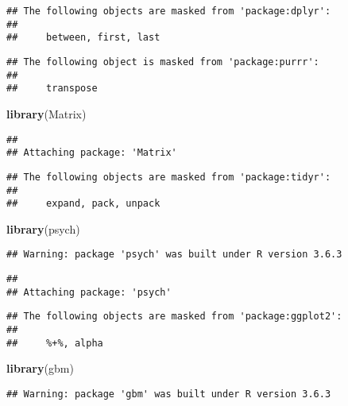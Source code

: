 \documentclass[]{article}
\newenvironment{Shaded}{\begin{snugshade}}{\end{snugshade}}
\newcommand{\KeywordTok}[1]{\textcolor[rgb]{0.13,0.29,0.53}{\textbf{#1}}}
\newcommand{\NormalTok}[1]{#1}
\begin{document}
\begin{verbatim}
## The following objects are masked from 'package:dplyr':
## 
##     between, first, last
\end{verbatim}

\begin{verbatim}
## The following object is masked from 'package:purrr':
## 
##     transpose
\end{verbatim}

\begin{Shaded}
\begin{Highlighting}[]
\KeywordTok{library}\NormalTok{(Matrix)}
\end{Highlighting}
\end{Shaded}

\begin{verbatim}
## 
## Attaching package: 'Matrix'
\end{verbatim}

\begin{verbatim}
## The following objects are masked from 'package:tidyr':
## 
##     expand, pack, unpack
\end{verbatim}

\begin{Shaded}
\begin{Highlighting}[]
\KeywordTok{library}\NormalTok{(psych)}
\end{Highlighting}
\end{Shaded}

\begin{verbatim}
## Warning: package 'psych' was built under R version 3.6.3
\end{verbatim}

\begin{verbatim}
## 
## Attaching package: 'psych'
\end{verbatim}

\begin{verbatim}
## The following objects are masked from 'package:ggplot2':
## 
##     %+%, alpha
\end{verbatim}

\begin{Shaded}
\begin{Highlighting}[]
\KeywordTok{library}\NormalTok{(gbm)}
\end{Highlighting}
\end{Shaded}

\begin{verbatim}
## Warning: package 'gbm' was built under R version 3.6.3
\end{verbatim}
\end{document}
